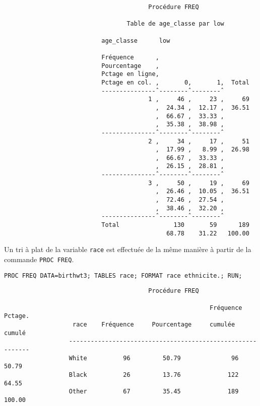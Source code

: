 \begin{verbatim}
                                        Procédure FREQ

                                  Table de age_classe par low

                           age_classe      low

                           Fréquence      ‚
                           Pourcentage    ‚
                           Pctage en ligne‚
                           Pctage en col. ‚       0‚       1‚  Total
                           ---------------ˆ--------ˆ--------ˆ
                                        1 ‚     46 ‚     23 ‚     69
                                          ‚  24.34 ‚  12.17 ‚  36.51
                                          ‚  66.67 ‚  33.33 ‚
                                          ‚  35.38 ‚  38.98 ‚
                           ---------------ˆ--------ˆ--------ˆ
                                        2 ‚     34 ‚     17 ‚     51
                                          ‚  17.99 ‚   8.99 ‚  26.98
                                          ‚  66.67 ‚  33.33 ‚
                                          ‚  26.15 ‚  28.81 ‚
                           ---------------ˆ--------ˆ--------ˆ
                                        3 ‚     50 ‚     19 ‚     69
                                          ‚  26.46 ‚  10.05 ‚  36.51
                                          ‚  72.46 ‚  27.54 ‚
                                          ‚  38.46 ‚  32.20 ‚
                           ---------------ˆ--------ˆ--------ˆ
                           Total               130       59      189
                                             68.78    31.22   100.00
\end{verbatim}

Un tri à plat de la variable \texttt{race} est effectuée de la même manière
à partir de la commande \texttt{PROC FREQ}.
\begin{verbatim}
PROC FREQ DATA=birthwt3; TABLES race; FORMAT race ethnicite.; RUN;
\end{verbatim}

\begin{verbatim}
                                        Procédure FREQ

                                                         Fréquence    Pctage.
                   race    Fréquence     Pourcentage     cumulée      cumulé
                  -----------------------------------------------------------
                  White          96         50.79              96      50.79
                  Black          26         13.76             122      64.55
                  Other          67         35.45             189     100.00
\end{verbatim}

